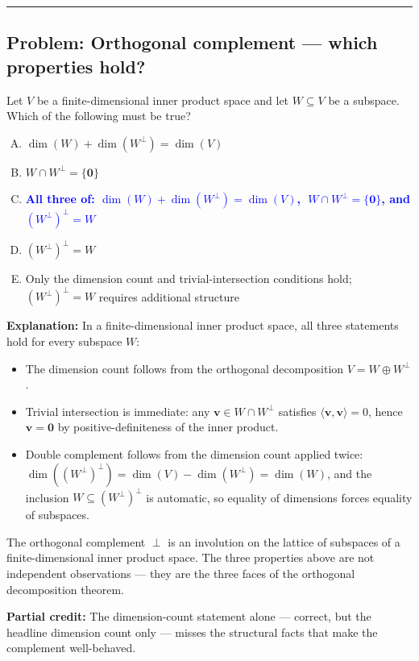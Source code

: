 \documentclass[12pt]{amsart}
\newcommand{\divider}{
  \vspace{-1em}
  \noindent
  \raisebox{-0.15ex}{\textbullet}%
  \hspace{0.5em}%
  \rule[0.5ex]{0.95\textwidth}{1.0pt}%
  \hspace{0.5em}%
  \raisebox{-0.15ex}{\textbullet}%
  \vspace{0em}
}
\begin{document}
\divider

\subsection*{Problem: Orthogonal complement --- which properties hold?}

Let $V$ be a finite-dimensional inner product space and let $W \subseteq V$
be a subspace. Which of the following must be true?

\begin{enumerate}[(A)]
\item $\dim(W) + \dim(W^\perp) = \dim(V)$
\item $W \cap W^\perp = \{\mathbf{0}\}$
\item \textcolor{blue}{\textbf{All three of: $\dim(W) + \dim(W^\perp) = \dim(V)$, $\;W \cap W^\perp = \{\mathbf{0}\}$, and $(W^\perp)^\perp = W$}}
\item $(W^\perp)^\perp = W$
\item Only the dimension count and trivial-intersection conditions hold; $(W^\perp)^\perp = W$ requires additional structure
\end{enumerate}

\textbf{Explanation:}
In a finite-dimensional inner product space, all three statements hold for
every subspace $W$:
\begin{itemize}
\item The dimension count follows from the orthogonal decomposition $V = W \oplus W^\perp$.
\item Trivial intersection is immediate: any $\mathbf{v} \in W \cap W^\perp$ satisfies $\langle \mathbf{v}, \mathbf{v} \rangle = 0$, hence $\mathbf{v} = \mathbf{0}$ by positive-definiteness of the inner product.
\item Double complement follows from the dimension count applied twice: $\dim((W^\perp)^\perp) = \dim(V) - \dim(W^\perp) = \dim(W)$, and the inclusion $W \subseteq (W^\perp)^\perp$ is automatic, so equality of dimensions forces equality of subspaces.
\end{itemize}

The orthogonal complement $\perp$ is an involution on the lattice of
subspaces of a finite-dimensional inner product space. The three properties
above are not independent observations --- they are the three faces of the
orthogonal decomposition theorem.

\textbf{Partial credit:}
The dimension-count statement alone --- correct, but the headline dimension
count only --- misses the structural facts that make the complement
well-behaved.
\end{document}
